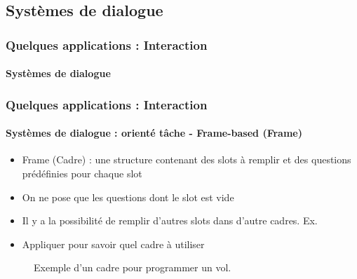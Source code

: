 \documentclass[xcolor=table]{beamer}
\begin{document}
\subsection{Systèmes de dialogue}

\begin{frame}
	\frametitle{Quelques applications : Interaction}
	\framesubtitle{Systèmes de dialogue}
\end{frame}

\begin{frame}
	\frametitle{Quelques applications : Interaction}
	\framesubtitle{Systèmes de dialogue : orienté tâche - Frame-based (Frame)}
	
	\begin{itemize}
		\item Frame (Cadre) : une structure contenant des slots à remplir et des questions prédéfinies pour chaque slot
		\item On ne pose que les questions dont le slot est vide
		\item Il y a la possibilité de remplir d'autres slots dans d'autre cadres. 
		Ex. 
		\item Appliquer  pour savoir quel cadre à utiliser
	\end{itemize}
	
	\begin{figure}
		\centering
		\caption{Exemple d'un cadre pour programmer un vol. \cite{2020-jurafsky-martin}}
	\end{figure}
	
\end{frame}
\end{document}
